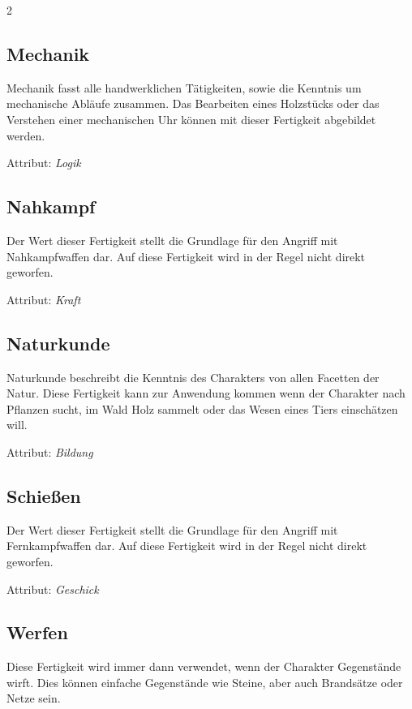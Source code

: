 \begin{multicols}{2}
\subsection{Mechanik}

Mechanik fasst alle handwerklichen Tätigkeiten, sowie die Kenntnis um mechanische Abläufe zusammen. Das Bearbeiten eines Holzstücks oder das Verstehen einer mechanischen Uhr können mit dieser Fertigkeit abgebildet werden.

Attribut: \textit{Logik}

\subsection{Nahkampf}

Der Wert dieser Fertigkeit stellt die Grundlage für den Angriff mit Nahkampfwaffen dar. Auf diese Fertigkeit wird in der Regel nicht direkt geworfen.

Attribut: \textit{Kraft}

\subsection{Naturkunde}

Naturkunde beschreibt die Kenntnis des Charakters von allen Facetten der Natur. Diese Fertigkeit kann zur Anwendung kommen wenn der Charakter nach Pflanzen sucht, im Wald Holz sammelt oder das Wesen eines Tiers einschätzen will.

Attribut: \textit{Bildung}

\subsection{Schießen}

Der Wert dieser Fertigkeit stellt die Grundlage für den Angriff mit Fernkampfwaffen dar. Auf diese Fertigkeit wird in der Regel nicht direkt geworfen.

Attribut: \textit{Geschick}

\subsection{Werfen}

Diese Fertigkeit wird immer dann verwendet, wenn der Charakter Gegenstände wirft. Dies können einfache Gegenstände wie Steine, aber auch Brandsätze oder Netze sein.


\end{multicols}
